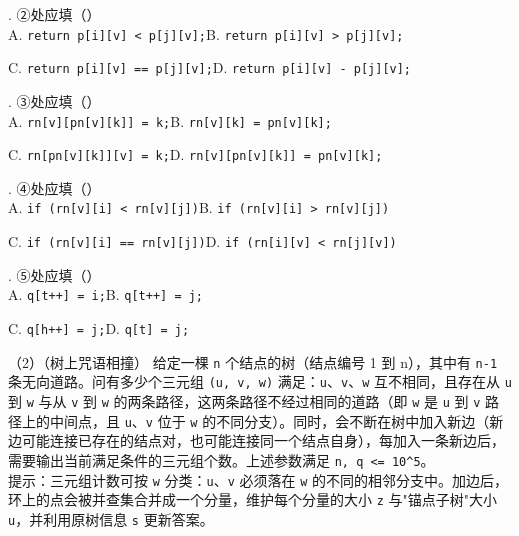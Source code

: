 \documentclass[a4paper]{ctexart}
\newcommand{\q}[1]{\noindent #1}
\newcommand{\optw}[2]{\hspace*{2em} #1\hspace*{2em}#2\par}
\begin{document}
\q{34.} ②处应填（\qquad）\\
\optw{A. \texttt{return p[i][v] < p[j][v];}}{B. \texttt{return p[i][v] > p[j][v];}}
\optw{C. \texttt{return p[i][v] == p[j][v];}}{D. \texttt{return p[i][v] - p[j][v];}}

\q{35.} ③处应填（\qquad）\\
\optw{A. \texttt{rn[v][pn[v][k]] = k;}}{B. \texttt{rn[v][k] = pn[v][k];}}
\optw{C. \texttt{rn[pn[v][k]][v] = k;}}{D. \texttt{rn[v][pn[v][k]] = pn[v][k];}}

\q{36.} ④处应填（\qquad）\\
\optw{A. \texttt{if (rn[v][i] < rn[v][j])}}{B. \texttt{if (rn[v][i] > rn[v][j])}}
\optw{C. \texttt{if (rn[v][i] == rn[v][j])}}{D. \texttt{if (rn[i][v] < rn[j][v])}}

\q{37.} ⑤处应填（\qquad）\\
\optw{A. \texttt{q[t++] = i;}}{B. \texttt{q[t++] = j;}}
\optw{C. \texttt{q[h++] = j;}}{D. \texttt{q[t] = j;}}

\clearpage
\noindent（2）（树上咒语相撞） 给定一棵 \texttt{n} 个结点的树（结点编号 1 到 n），其中有 \texttt{n-1} 条无向道路。问有多少个三元组 \texttt{(u, v, w)} 满足：\texttt{u}、\texttt{v}、\texttt{w} 互不相同，且存在从 \texttt{u} 到 \texttt{w} 与从 \texttt{v} 到 \texttt{w} 的两条路径，这两条路径不经过相同的道路（即 \texttt{w} 是 \texttt{u} 到 \texttt{v} 路径上的中间点，且 \texttt{u}、\texttt{v} 位于 \texttt{w} 的不同分支）。同时，会不断在树中加入新边（新边可能连接已存在的结点对，也可能连接同一个结点自身），每加入一条新边后，需要输出当前满足条件的三元组个数。上述参数满足 \texttt{n, q <= 10\^{}5}。\\

提示：三元组计数可按 \texttt{w} 分类：\texttt{u}、\texttt{v} 必须落在 \texttt{w} 的不同的相邻分支中。加边后，环上的点会被并查集合并成一个分量，维护每个分量的大小 \texttt{z} 与"锚点子树"大小 \texttt{u}，并利用原树信息 \texttt{s} 更新答案。
\end{document}
